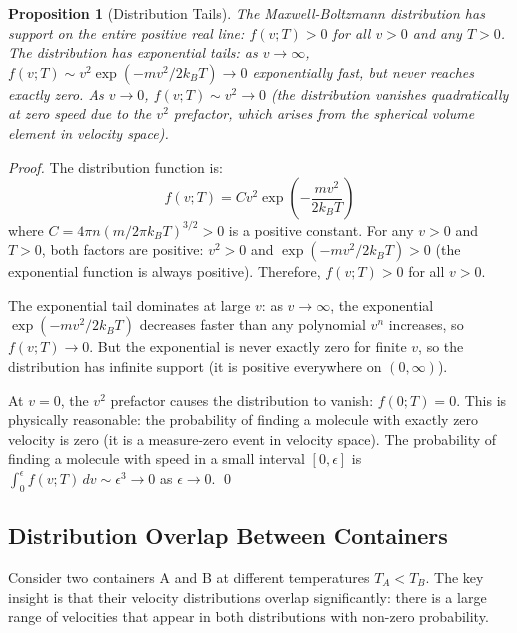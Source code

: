 \documentclass[12pt,a4paper]{article}
\newtheorem{proposition}[theorem]{Proposition}
\theoremstyle{definition}
\theoremstyle{remark}
\begin{document}
\begin{proposition}[Distribution Tails]
\label{prop:distribution_tails}
The Maxwell-Boltzmann distribution has support on the entire positive real line: $f(v; T) > 0$ for all $v > 0$ and any $T > 0$. The distribution has exponential tails: as $v \to \infty$, $f(v; T) \sim v^2 \exp(-mv^2 / 2k_B T) \to 0$ exponentially fast, but never reaches exactly zero. As $v \to 0$, $f(v; T) \sim v^2 \to 0$ (the distribution vanishes quadratically at zero speed due to the $v^2$ prefactor, which arises from the spherical volume element in velocity space).
\end{proposition}

\begin{proof}
The distribution function is:
\begin{equation}
f(v; T) = C v^2 \exp\left(-\frac{mv^2}{2k_B T}\right)
\end{equation}
where $C = 4\pi n (m / 2\pi k_B T)^{3/2} > 0$ is a positive constant. For any $v > 0$ and $T > 0$, both factors are positive: $v^2 > 0$ and $\exp(-mv^2 / 2k_B T) > 0$ (the exponential function is always positive). Therefore, $f(v; T) > 0$ for all $v > 0$.

The exponential tail dominates at large $v$: as $v \to \infty$, the exponential $\exp(-mv^2 / 2k_B T)$ decreases faster than any polynomial $v^n$ increases, so $f(v; T) \to 0$. But the exponential is never exactly zero for finite $v$, so the distribution has infinite support (it is positive everywhere on $(0, \infty)$).

At $v = 0$, the $v^2$ prefactor causes the distribution to vanish: $f(0; T) = 0$. This is physically reasonable: the probability of finding a molecule with exactly zero velocity is zero (it is a measure-zero event in velocity space). The probability of finding a molecule with speed in a small interval $[0, \epsilon]$ is $\int_0^\epsilon f(v; T) \, dv \sim \epsilon^3 \to 0$ as $\epsilon \to 0$. \qed
\end{proof}

\subsection{Distribution Overlap Between Containers}

Consider two containers A and B at different temperatures $T_A < T_B$. The key insight is that their velocity distributions overlap significantly: there is a large range of velocities that appear in both distributions with non-zero probability.
\end{document}

